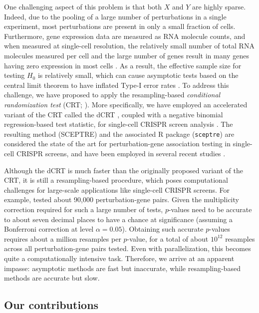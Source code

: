 \documentclass[12pt]{article}
\theoremstyle{definition}
\newcommand{\srx}{X}									%
\newcommand{\sry}{Y}									%
\begin{document}
One challenging aspect of this problem is that both $\srx$ and $\sry$ are highly sparse. Indeed, due to the pooling of a large number of perturbations in a single experiment, most perturbations are present in only a small fraction of cells. Furthermore, gene expression data are measured as RNA molecule counts, and when measured at single-cell resolution, the relatively small number of total RNA molecules measured per cell and the large number of genes result in many genes having zero expression in most cells \citep{Svensson2020}. As a result, the effective sample size for testing $H_0$ is relatively small, which can cause asymptotic tests based on the central limit theorem to have inflated Type-I error rates \citep{Barry2024}. To address this challenge, we have proposed to apply the resampling-based \textit{conditional randomization test} (CRT; \cite{CetL16}). More specifically, we have employed an accelerated variant of the CRT called the dCRT \citep{Liu2022a}, coupled with a negative binomial regression-based test statistic, for single-cell CRISPR screen analysis \citep{Katsevich2020c}. The resulting method (SCEPTRE) and the associated R package (\verb|sceptre|) are considered the state of the art for perturbation-gene association testing in single-cell CRISPR screens, and have been employed in several recent studies \citep{Morris2021d,Tuano2023,Chardon2023a,Conery2024}.

Although the dCRT is much faster than the originally proposed variant of the CRT, it is still a resampling-based procedure, which poses computational challenges for large-scale applications like single-cell CRISPR screens. For example, \citet{Gasperini2019a} tested about 90,000 perturbation-gene pairs. Given the multiplicity correction required for such a large number of tests, $p$-values need to be accurate to about seven decimal places to have a chance at significance (assuming a Bonferroni correction at level $\alpha = 0.05$). Obtaining such accurate $p$-values requires about a million resamples per $p$-value, for a total of about $10^{12}$ resamples across all perturbation-gene pairs tested. Even with parallelization, this becomes quite a computationally intensive task. Therefore, we arrive at an apparent impasse: asymptotic methods are fast but inaccurate, while resampling-based methods are accurate but slow.

\subsection{Our contributions}
\end{document}
